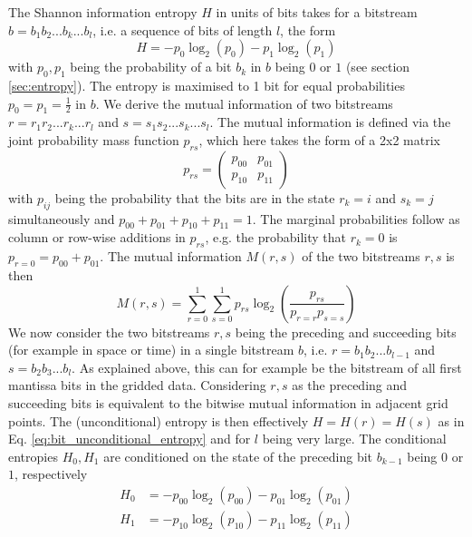 The Shannon information entropy $H$ in units of bits \citep{Shannon1948} takes for a bitstream $b = b_1b_2...b_k...b_l$, i.e. a sequence
of bits of length $l$, the form
	\begin{equation}
	H = -p_0\log_2(p_0) - p_1\log_2(p_1)
	\label{eq:bit_unconditional_entropy}
	\end{equation}
with $p_0,p_1$ being the probability of a bit $b_k$ in $b$ being $0$ or $1$ (see section \ref{sec:entropy}).
The entropy is maximised to 1 bit for equal probabilities $p_0 = p_1 = \tfrac{1}{2}$ in $b$. We derive the mutual information
\citep{Schreiber2000,Kraskov2004,Pothapakula2019}
of two bitstreams $r = r_1r_2...r_k...r_l$ and $s = s_1s_2...s_k...s_l$. The mutual information is defined via the joint probability
mass function $p_{rs}$, which here takes the form of a 2x2 matrix
 	\begin{equation}
	p_{rs} = \begin{pmatrix} p_{00} & p_{01} \\ p_{10} & p_{11} \end{pmatrix}
	\end{equation}
with $p_{ij}$ being the probability that the bits are in the state $r_k = i$ and $s_k = j$ simultaneously and $p_{00} + p_{01} + p_{10} + p_{11} = 1$.
The marginal probabilities follow as column or row-wise additions in $p_{rs}$, e.g. the probability that $r_k = 0$ is $p_{r=0} = p_{00} + p_{01}$.
The mutual information $M(r,s)$ of the two bitstreams $r,s$ is then
	\begin{equation}
	M(r,s) = \sum_{r=0}^1 \sum_{s=0}^1 p_{rs} \log_2 \left( \frac{p_{rs}}{p_{r=r}p_{s=s}} \right)
	\end{equation}
We now consider the two bitstreams $r,s$ being the preceding and succeeding bits (for example in space or time) in a single bitstream $b$,
i.e. $r=b_1b_2...b_{l-1}$ and $s=b_2b_3...b_l$. As explained above, this can for example be the bitstream of all first mantissa bits in the
gridded data. Considering $r,s$ as the preceding and succeeding bits is equivalent to the bitwise mutual information in adjacent grid points.
The (unconditional) entropy is then effectively $H = H(r) = H(s)$ as in Eq. \ref{eq:bit_unconditional_entropy} and for $l$ being very large.
The conditional entropies $H_0,H_1$ are conditioned on the state of the preceding bit $b_{k-1}$ being $0$ or $1$, respectively
	\begin{align}
	H_0 &= -p_{00} \log_2(p_{00}) - p_{01} \log_2(p_01)\\
	H_1 &= -p_{10} \log_2(p_{10}) - p_{11} \log_2(p_11) 
	\end{align}
